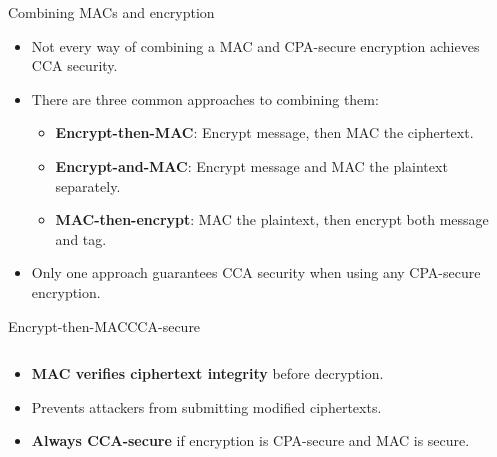 \documentclass[aspectratio=169, lualatex, handout]{beamer}
\begin{document}
\begin{frame}{Combining MACs and encryption}
	\begin{itemize}[<+->]
		\item Not every way of combining a MAC and CPA-secure encryption achieves CCA security.
		\item There are three common approaches to combining them:
		      \begin{itemize}
			      \item \textbf{Encrypt-then-MAC}: Encrypt message, then MAC the ciphertext.
			      \item \textbf{Encrypt-and-MAC}: Encrypt message and MAC the plaintext separately.
			      \item \textbf{MAC-then-encrypt}: MAC the plaintext, then encrypt both message and tag.
		      \end{itemize}
		\item Only one approach guarantees CCA security when using any CPA-secure encryption.
	\end{itemize}
\end{frame}

\begin{frame}{Encrypt-then-MAC}{CCA-secure}
	\begin{columns}[c]
		\begin{column}{0.5\textwidth}
			\begin{itemize}[<+->]
				\item \textbf{MAC verifies ciphertext integrity} before decryption.
				\item Prevents attackers from submitting modified ciphertexts.
				\item \textbf{Always CCA-secure} if encryption is CPA-secure and MAC is secure.
			\end{itemize}
		\end{column}
		\begin{column}{0.5\textwidth}
		\end{column}
	\end{columns}
\end{frame}
\end{document}
